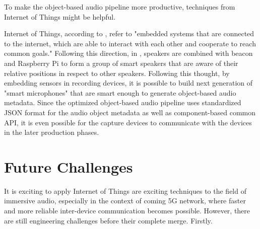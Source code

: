 \documentclass[jou]{apa6}
\begin{document}
To make the object-based audio pipeline more productive, techniques from Internet of Things might be helpful. 

Internet of Things, according to \textcite{turchet2018internet}, refer to "embedded systems that are connected to the internet, which are able to interact with each other and cooperate to reach common goals." Following this direction, in \textcite{lee2017location}, speakers are combined with beacon and Raspberry Pi to form a group of smart speakers that are aware of their relative positions in respect to other speakers. Following this thought, by embedding sensors in recording devices, it is possible to build next generation of "smart microphones" that are smart enough to generate object-based audio metadata. Since the optimized object-based audio pipeline uses standardized JSON format for the audio object metadata as well as component-based common API, it is even possible for the capture devices to communicate with the devices in the later production phases.

\section{Future Challenges}

It is exciting to apply Internet of Things are exciting techniques to the field of immersive audio, especially in the context of coming 5G network, where faster and more reliable inter-device communication becomes possible. However, there are still engineering challenges before their complete merge. Firstly.

\printbibliography
\end{document}
